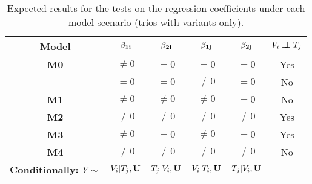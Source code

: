 \documentclass[12pt]{report}
\begin{document}
\begin{table}[H]
\centering
\caption{ Expected results for the tests on the regression coefficients under each model scenario (trios with variants only).}
\begin{tabular}{|c||cccc|c|}
\hline
\bf Model  & $\bf\beta_{1i}$  &  $\bf\beta_{2i}$   & $\bf\beta_{1j}$    & $\bf\beta_{2j}$    & $ V_i \perp \!\!\! \perp T_j$    \\ \hline \hline
\bf M0      &  $\neq 0$            & $= 0$                  & $=0$                    & $=0$                    & Yes   \\ \hline 
               &  $= 0$                & $= 0$                  & $\neq 0$                & $= 0$                  & No     \\ \hline
\bf M1      &  $\neq 0$            &  $\neq 0$             & $\neq0$                & $= 0$             & No     \\ \hline
\bf M2      &   $\neq0$            &  $\neq 0$             & $\neq0$                & $\neq0$               & Yes   \\ \hline
\bf M3      &   $\neq 0$           &  $= 0$                 & $\neq0$                & $=0$                   & Yes   \\ \hline
\bf M4      &   $\neq0$            &  $\neq 0$             & $\neq0$                & $\neq0$               & No    \\ \hline \hline
\bf Conditionally:  $Y \sim$& $V_i|T_j,{\bf U}$  &  $T_j|V_i, {\bf U}$   & $V_i| T_i, {\bf U}$    & $T_j|V_i,{\bf U}$    &   \\ \hline 
\end{tabular}
\end{table}
\end{document}
